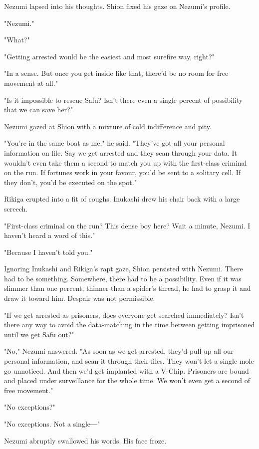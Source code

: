 Nezumi lapsed into his thoughts. Shion fixed his gaze on Nezumi's
profile.

"Nezumi."

"What?"

"Getting arrested would be the easiest and most surefire way, right?"

"In a sense. But once you get inside like that, there'd be no room for
free movement at all."

"Is it impossible to rescue Safu? Isn't there even a single percent of
possibility that we can save her?"

Nezumi gazed at Shion with a mixture of cold indifference and pity.

"You're in the same boat as me," he said. "They've got all your personal
information on file. Say we get arrested and they scan through your
data. It wouldn't even take them a second to match you up with the
first-class criminal on the run. If fortunes work in your favour, you'd
be sent to a solitary cell. If they don't, you'd be executed on the
spot."

Rikiga erupted into a fit of coughs. Inukashi drew his chair back with a
large screech.

"First-class criminal on the run? This dense boy here? Wait a minute,
Nezumi. I haven't heard a word of this."

"Because I haven't told you."

Ignoring Inukashi and Rikiga's rapt gaze, Shion persisted with Nezumi.
There had to be something. Somewhere, there had to be a possibility.
Even if it was slimmer than one percent, thinner than a spider's thread,
he had to grasp it and draw it toward him. Despair was not permissible.

"If we get arrested as prisoners, does everyone get searched
immediately? Isn't there any way to avoid the data-matching in the time
between getting imprisoned until we get Safu out?"

"No," Nezumi answered. "As soon as we get arrested, they'd pull up all
our personal information, and scan it through their files. They won't
let a single mole go unnoticed. And then we'd get implanted with a
V-Chip. Prisoners are bound and placed under surveillance for the whole
time. We won't even get a second of free movement."

"No exceptions?"

"No exceptions. Not a single―"

Nezumi abruptly swallowed his words. His face froze.

